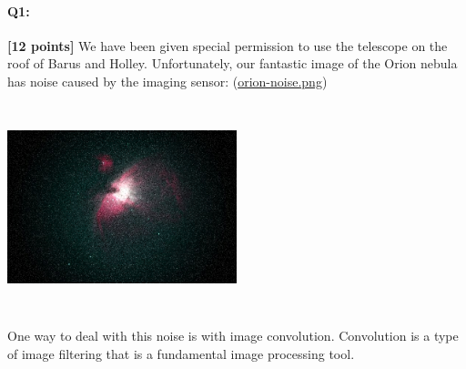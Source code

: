 \documentclass[11pt]{article}
\begin{document}
\pagebreak

\paragraph{Q1:} \textbf{[12 points]} 
We have been given special permission to use the telescope on the roof of Barus and Holley. Unfortunately, our fantastic image of the Orion nebula has noise caused by the imaging sensor: (\href{run:images/orion-noise.png}{orion-noise.png})

\begin{center}
\includegraphics[width=0.5\textwidth,height=6cm,keepaspectratio]
{images/orion-noise.png}
\end{center}

One way to deal with this noise is with image convolution. 
Convolution is a type of image filtering that is a fundamental image processing tool.
\end{document}
